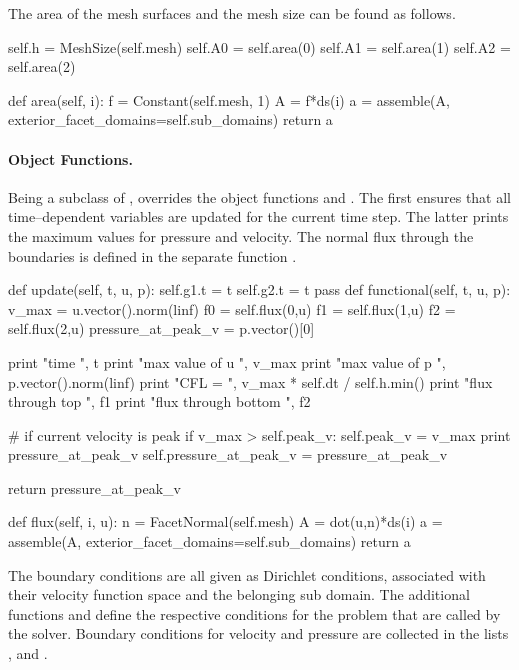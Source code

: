 The area of the mesh surfaces and the mesh size can be found as follows. 
\begin{code}
self.h = MeshSize(self.mesh)
self.A0 = self.area(0)
self.A1 = self.area(1)
self.A2 = self.area(2)

def area(self, i): 
	f = Constant(self.mesh, 1)
	A = f*ds(i)
	a = assemble(A, exterior_facet_domains=self.sub_domains)
	return a 
\end{code}



\paragraph{Object Functions.} Being a subclass of ,  overrides the object functions  and . The first ensures that all time--dependent variables are updated for the current time step. The latter prints the maximum values for pressure and velocity. The normal flux through the boundaries is defined in the separate function .
\begin{code}
def update(self, t, u, p):
	self.g1.t = t
	self.g2.t = t
	pass
def functional(self, t, u, p):
	v_max = u.vector().norm(linf)
	f0 = self.flux(0,u)
	f1 = self.flux(1,u)
	f2 = self.flux(2,u)
	pressure_at_peak_v = p.vector()[0]

	print "time ", t 
	print "max value of u ", v_max
	print "max value of p ", p.vector().norm(linf)
	print "CFL = ", v_max * self.dt / self.h.min()
	print "flux through top ", f1
	print "flux through bottom ", f2

	# if current velocity is peak
	if v_max >  self.peak_v:
		self.peak_v = v_max
		print pressure_at_peak_v
		self.pressure_at_peak_v = pressure_at_peak_v

	return pressure_at_peak_v

def flux(self, i, u): 
	n = FacetNormal(self.mesh)
	A = dot(u,n)*ds(i)
	a = assemble(A, exterior_facet_domains=self.sub_domains)
	return a 
\end{code}

The boundary conditions are all given as Dirichlet conditions,
associated with their velocity function space and the belonging sub
domain. The additional functions  and
 define the respective conditions for the
problem that are called by the solver. Boundary conditions for
velocity and pressure  are collected in the lists ,
 and .

